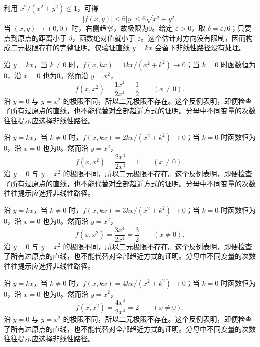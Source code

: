 \documentclass[UTF8,12pt,a4paper,fontset=fandol]{ctexart}
\begin{document}
\begin{solve}\label{ans:c32q7}
利用 $x^2/(x^2+y^2)\le1$，可得
\[
|f(x,y)|\le 6|y|\le 6\sqrt{x^2+y^2}.
\]
当 $(x,y)\to(0,0)$ 时，右侧趋零，故极限为0。给定 $\varepsilon>0$，取 $\delta=\varepsilon/6$；只要点到原点的距离小于 $\delta$，函数绝对值就小于 $\varepsilon$。这个估计对方向没有限制，因而构成二元极限存在的完整证明。仅验证直线 $y=kx$ 会留下非线性路径没有处理。
\end{solve}

\begin{solve}\label{ans:c32q8}
沿 $y=kx$，当 $k\ne0$ 时，$f(x,kx)=1kx/(x^2+k^2)\to0$；当 $k=0$ 时函数恒为0，沿 $x=0$ 也为0。然而沿 $y=x^2$，
\[
f(x,x^2)=\frac{1x^4}{2x^4}=\frac{1}{2}\qquad(x\ne0).
\]
沿 $y=0$ 与 $y=x^2$ 的极限不同，所以二元极限不存在。这个反例表明，即便检查了所有过原点的直线，也不能代替对全部趋近方式的证明。分母中不同变量的次数往往提示应选择非线性路径。
\end{solve}

\begin{solve}\label{ans:c32q9}
沿 $y=kx$，当 $k\ne0$ 时，$f(x,kx)=2kx/(x^2+k^2)\to0$；当 $k=0$ 时函数恒为0，沿 $x=0$ 也为0。然而沿 $y=x^2$，
\[
f(x,x^2)=\frac{2x^4}{2x^4}=1\qquad(x\ne0).
\]
沿 $y=0$ 与 $y=x^2$ 的极限不同，所以二元极限不存在。这个反例表明，即便检查了所有过原点的直线，也不能代替对全部趋近方式的证明。分母中不同变量的次数往往提示应选择非线性路径。
\end{solve}

\begin{solve}\label{ans:c32q10}
沿 $y=kx$，当 $k\ne0$ 时，$f(x,kx)=3kx/(x^2+k^2)\to0$；当 $k=0$ 时函数恒为0，沿 $x=0$ 也为0。然而沿 $y=x^2$，
\[
f(x,x^2)=\frac{3x^4}{2x^4}=\frac{3}{2}\qquad(x\ne0).
\]
沿 $y=0$ 与 $y=x^2$ 的极限不同，所以二元极限不存在。这个反例表明，即便检查了所有过原点的直线，也不能代替对全部趋近方式的证明。分母中不同变量的次数往往提示应选择非线性路径。
\end{solve}

\begin{solve}\label{ans:c32q11}
沿 $y=kx$，当 $k\ne0$ 时，$f(x,kx)=4kx/(x^2+k^2)\to0$；当 $k=0$ 时函数恒为0，沿 $x=0$ 也为0。然而沿 $y=x^2$，
\[
f(x,x^2)=\frac{4x^4}{2x^4}=2\qquad(x\ne0).
\]
沿 $y=0$ 与 $y=x^2$ 的极限不同，所以二元极限不存在。这个反例表明，即便检查了所有过原点的直线，也不能代替对全部趋近方式的证明。分母中不同变量的次数往往提示应选择非线性路径。
\end{solve}
\end{document}
